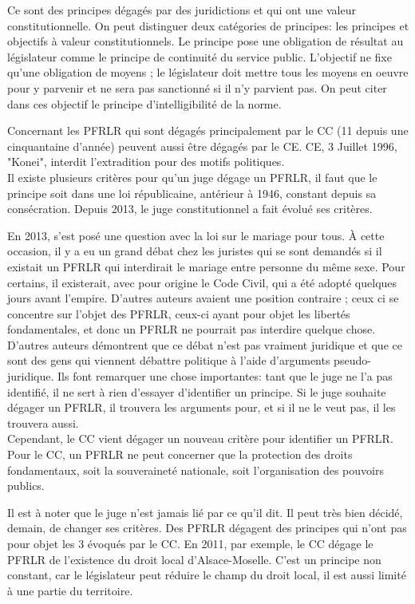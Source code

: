 \documentclass[10pt, a4paper, openany]{book}
\begin{document}
Ce sont des principes dégagés par des juridictions et qui ont une valeur constitutionnelle. On peut distinguer deux catégories de principes: les principes et objectifs à valeur constitutionnels. Le principe pose une obligation de résultat au législateur comme le principe de continuité du service public. L'objectif ne fixe qu'une obligation de moyens ; le législateur doit mettre tous les moyens en oeuvre pour y parvenir et ne sera pas sanctionné si il n'y parvient pas. On peut citer dans ces objectif le principe d'intelligibilité de la norme. 


Concernant les PFRLR qui sont dégagés principalement par le CC (11 depuis une cinquantaine d'année) peuvent aussi être dégagés par le CE. CE, 3 Juillet 1996, "Konei", interdit l'extradition pour des motifs politiques. \\
Il existe plusieurs critères pour qu'un juge dégage un PFRLR, il faut que le principe soit dans une loi républicaine, antérieur à 1946, constant depuis sa consécration. Depuis 2013, le juge constitutionnel a fait évolué ses critères.


En 2013, s'est posé une question avec la loi sur le mariage pour tous. À cette occasion, il y a eu un grand débat chez les juristes qui se sont demandés si il existait un PFRLR qui interdirait le mariage entre personne du même sexe. Pour certains, il existerait, avec pour origine le Code Civil, qui a été adopté quelques jours avant l'empire. D'autres auteurs avaient une position contraire ; ceux ci se concentre sur l'objet des PFRLR, ceux-ci ayant pour objet les libertés fondamentales, et donc un PFRLR ne pourrait pas interdire quelque chose. \\
D'autres auteurs démontrent que ce débat n'est pas vraiment juridique et que ce sont des gens qui viennent débattre politique à l'aide d'arguments pseudo-juridique. Ils font remarquer une chose importantes: tant que le juge ne l'a pas identifié, il ne sert à rien d'essayer d'identifier un principe. Si le juge souhaite dégager un PFRLR, il trouvera les arguments pour, et si il ne le veut pas, il les trouvera aussi. \\
Cependant, le CC vient dégager un nouveau critère pour identifier un PFRLR. Pour le CC, un PFRLR ne peut concerner que la protection des droits fondamentaux, soit la souveraineté nationale, soit l'organisation des pouvoirs publics.


Il est à noter que le juge n'est jamais lié par ce qu'il dit. Il peut très bien décidé, demain, de changer ses critères. Des PFRLR dégagent des principes qui n'ont pas pour objet les 3 évoqués par le CC. En 2011, par exemple, le CC dégage le PFRLR de l'existence du droit local d'Alsace-Moselle. C'est un principe non constant, car le législateur peut réduire le champ du droit local, il est aussi limité à une partie du territoire. 
\end{document}
